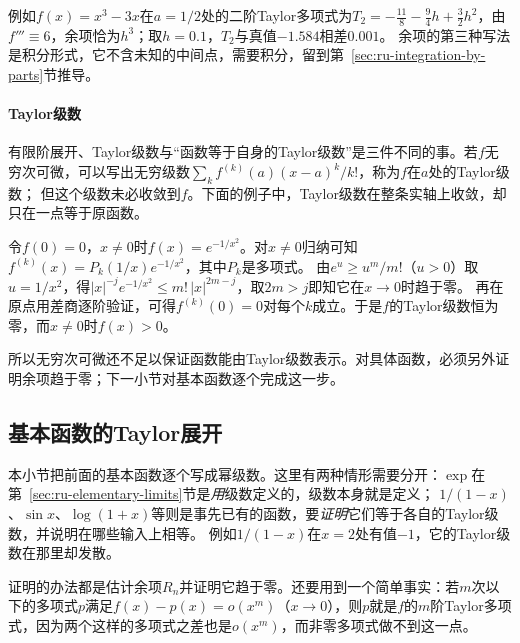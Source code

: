 例如$f(x)=x^3-3x$在$a=1/2$处的二阶Taylor多项式为$T_2=-\tfrac{11}8-\tfrac94h+\tfrac32h^2$，由$f'''\equiv6$，余项恰为$h^3$；取$h=0.1$，$T_2$与真值$-1.584$相差$0.001$。
余项的第三种写法是积分形式，它不含未知的中间点，需要积分，留到第~\ref{sec:ru-integration-by-parts}节推导。

\paragraph{Taylor级数}
有限阶展开、Taylor级数与“函数等于自身的Taylor级数”是三件不同的事。若$f$无穷次可微，可以写出无穷级数$\sum_kf^{(k)}(a)(x-a)^k/k!$，称为$f$在$a$处的Taylor级数；
但这个级数未必收敛到$f$。下面的例子中，Taylor级数在整条实轴上收敛，却只在一点等于原函数。
\begin{example}[光滑但不等于自身Taylor级数的函数]
\label{ex:ru-smooth-not-analytic}
令$f(0)=0$，$x\neq0$时$f(x)=e^{-1/x^2}$。对$x\neq0$归纳可知$f^{(k)}(x)=P_k(1/x)e^{-1/x^2}$，其中$P_k$是多项式。
由$e^u\geq u^m/m!$（$u>0$）取$u=1/x^2$，得$|x|^{-j}e^{-1/x^2}\leq m!\,|x|^{2m-j}$，取$2m>j$即知它在$x\to0$时趋于零。
再在原点用差商逐阶验证，可得$f^{(k)}(0)=0$对每个$k$成立。于是$f$的Taylor级数恒为零，而$x\neq0$时$f(x)>0$。
\end{example}
所以无穷次可微还不足以保证函数能由Taylor级数表示。对具体函数，必须另外证明余项趋于零；下一小节对基本函数逐个完成这一步。

\subsection{基本函数的Taylor展开}
\label{sec:ru-elementary-taylor}
\label{sec:ru-exp-expansion}

本小节把前面的基本函数逐个写成幂级数。这里有两种情形需要分开：$\exp$在第~\ref{sec:ru-elementary-limits}节是\emph{用}级数定义的，级数本身就是定义；
$1/(1-x)$、$\sin x$、$\log(1+x)$等则是事先已有的函数，要\emph{证明}它们等于各自的Taylor级数，并说明在哪些输入上相等。
例如$1/(1-x)$在$x=2$处有值$-1$，它的Taylor级数在那里却发散。

证明的办法都是估计余项$R_n$并证明它趋于零。还要用到一个简单事实：若$m$次以下的多项式$p$满足$f(x)-p(x)=o(x^m)$（$x\to0$），则$p$就是$f$的$m$阶Taylor多项式，因为两个这样的多项式之差也是$o(x^m)$，而非零多项式做不到这一点。


